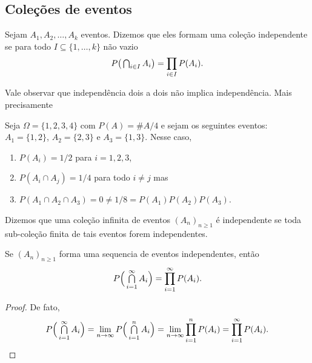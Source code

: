 \subsection{Coleções de eventos}


\begin{definition}
  Sejam $A_1, A_2, \dots, A_k$ eventos.
  Dizemos que eles formam uma coleção independente  se para todo $I \subseteq \{1, \dots, k\}$ não vazio
  \begin{equation}
    P\big( \operatorname*{{\textstyle \bigcap}}\nolimits_{i \in I} A_i \big) =  \prod\limits_{i \in I} P(A_i).
  \end{equation}
\end{definition}

Vale observar que independência dois a dois não implica independência.
Mais precisamente
\begin{example}
  Seja $\Omega = \{1,2,3,4\}$ com $P(A) = \# A/4$ e sejam os seguintes eventos: $A_1 = \{1,2\}$, $A_2 = \{2,3\}$ e $A_3 = \{1,3\}$.
  Nesse caso,
  \begin{enumerate}[\quad a)]
  \item $P(A_i) = 1/2$ para $i = 1, 2, 3$,
  \item $P(A_i \cap A_j) = 1/4$ para todo $i \neq j$ mas
  \item $P(A_1 \cap A_2 \cap A_3) = 0 \neq 1/8 = P(A_1) P(A_2) P(A_3)$.
  \end{enumerate}
\end{example}

\begin{definition}
  Dizemos que uma coleção infinita de eventos $(A_n)_{n\ge 1}$ é independente  se toda sub-coleção finita de tais eventos forem independentes.
\end{definition}

\begin{lemma}
  Se $(A_n)_{n\ge 1}$ forma uma sequencia de eventos independentes, então
  \begin{equation}
    P\Big( \operatorname*{{\textstyle \bigcap}}_{i=1}^{\infty} A_i \Big) = \prod\limits_{i=1}^{\infty} P(A_i).
  \end{equation}
\end{lemma}

\begin{proof}
  De fato,
  \begin{equation*}
    P\Big( \operatorname*{{\textstyle \bigcap}}_{i=1}^{\infty} A_i \Big) = \lim_{n\to \infty} P\Big( \operatorname*{{\textstyle \bigcap}}_{i = 1}^n A_i \Big) = \lim_{n\to \infty} \prod\limits_{i=1}^n P(A_i) = \prod\limits_{i=1}^{\infty} P(A_i). \qedhere
  \end{equation*}
\end{proof}

